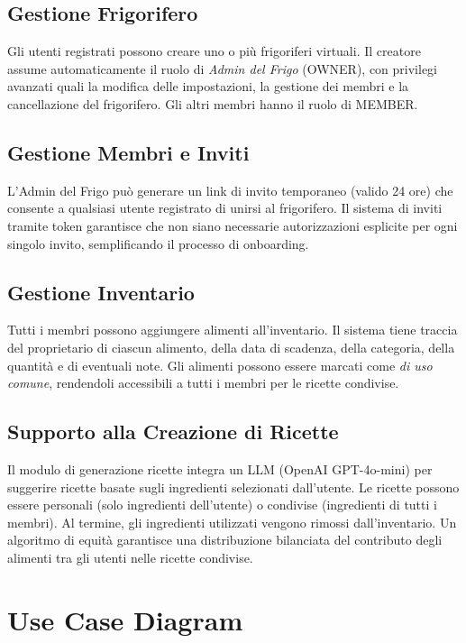 \documentclass[12pt,a4paper,twoside]{report}
\begin{document}
\subsection{Gestione Frigorifero}

Gli utenti registrati possono creare uno o più frigoriferi virtuali. Il creatore assume automaticamente il ruolo di \textit{Admin del Frigo} (OWNER), con privilegi avanzati quali la modifica delle impostazioni, la gestione dei membri e la cancellazione del frigorifero. Gli altri membri hanno il ruolo di MEMBER.

\subsection{Gestione Membri e Inviti}

L'Admin del Frigo può generare un link di invito temporaneo (valido 24 ore) che consente a qualsiasi utente registrato di unirsi al frigorifero. Il sistema di inviti tramite token garantisce che non siano necessarie autorizzazioni esplicite per ogni singolo invito, semplificando il processo di onboarding.

\subsection{Gestione Inventario}

Tutti i membri possono aggiungere alimenti all'inventario. Il sistema tiene traccia del proprietario di ciascun alimento, della data di scadenza, della categoria, della quantità e di eventuali note. Gli alimenti possono essere marcati come \textit{di uso comune}, rendendoli accessibili a tutti i membri per le ricette condivise.

\subsection{Supporto alla Creazione di Ricette}

Il modulo di generazione ricette integra un LLM (OpenAI GPT-4o-mini) per suggerire ricette basate sugli ingredienti selezionati dall'utente. Le ricette possono essere personali (solo ingredienti dell'utente) o condivise (ingredienti di tutti i membri). Al termine, gli ingredienti utilizzati vengono rimossi dall'inventario. Un algoritmo di equità garantisce una distribuzione bilanciata del contributo degli alimenti tra gli utenti nelle ricette condivise.


\section{Use Case Diagram}
\end{document}
